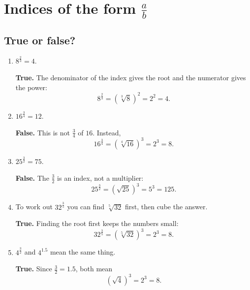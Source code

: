 \documentclass[11pt]{article}
\begin{document}
\section{Indices of the form \texorpdfstring{$\frac{a}{b}$}{a/b}}

\subsection*{True or false?}
\begin{enumerate}
\item $8^{\frac{2}{3}}=4$.

\textbf{True.} The denominator of the index gives the root and the numerator gives the power:
\[
8^{\frac{2}{3}}=\left(\sqrt[3]{8}\right)^2=2^2=4.
\]

\item $16^{\frac{3}{4}}=12$.

\textbf{False.} This is not $\frac{3}{4}$ of $16$. Instead,
\[
16^{\frac{3}{4}}=\left(\sqrt[4]{16}\right)^3=2^3=8.
\]

\item $25^{\frac{3}{2}}=75$.

\textbf{False.} The $\frac{3}{2}$ is an index, not a multiplier:
\[
25^{\frac{3}{2}}=\left(\sqrt{25}\right)^3=5^3=125.
\]

\item To work out $32^{\frac{3}{5}}$ you can find $\sqrt[5]{32}$ first, then cube the answer.

\textbf{True.} Finding the root first keeps the numbers small:
\[
32^{\frac{3}{5}}=\left(\sqrt[5]{32}\right)^3=2^3=8.
\]

\item $4^{\frac{3}{2}}$ and $4^{1.5}$ mean the same thing.

\textbf{True.} Since $\frac{3}{2}=1.5$, both mean
\[
\left(\sqrt{4}\right)^3=2^3=8.
\]
\end{enumerate}
\end{document}
